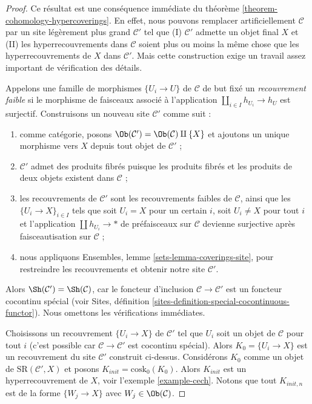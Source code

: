 \begin{proof}
Ce résultat est une conséquence immédiate du
théorème \ref{theorem-cohomology-hypercoverings}.
En effet, nous pouvons remplacer artificiellement $\mathcal{C}$ par un site
légèrement plus grand $\mathcal{C}'$ tel que
(I) $\mathcal{C}'$ admette un objet final $X$ et (II)
les hyperrecouvrements dans $\mathcal{C}$ soient plus ou moins la
même chose que les hyperrecouvrements de $X$ dans $\mathcal{C}'$.
Mais cette construction exige un travail assez important de
vérification des détails.

\medskip\noindent
Appelons une famille de morphismes $\{U_i \to U\}$ de $\mathcal{C}$
de but fixé un {\it recouvrement faible} si le morphisme de faisceaux associé à
l'application $\coprod_{i \in I} h_{U_i} \to h_U$ est surjectif.
Construisons un nouveau site $\mathcal{C}'$ comme suit :
\begin{enumerate}
\item comme catégorie, posons $\Ob(\mathcal{C}') = \Ob(\mathcal{C}) \amalg \{X\}$
et ajoutons un unique morphisme vers $X$ depuis tout objet de $\mathcal{C}'$ ;
\item $\mathcal{C}'$ admet des produits fibrés puisque les produits fibrés et les produits
de deux objets existent dans $\mathcal{C}$ ;
\item les recouvrements de $\mathcal{C}'$ sont les recouvrements faibles de $\mathcal{C}$,
ainsi que les $\{U_i \to X\}_{i \in I}$ tels que soit $U_i = X$
pour un certain $i$, soit $U_i \not = X$ pour tout $i$ et l'application
$\coprod h_{U_i} \to *$ de préfaisceaux sur $\mathcal{C}$ devienne
surjective après faisceautisation sur $\mathcal{C}$ ;
\item nous appliquons Ensembles, lemme \ref{sets-lemma-coverings-site},
pour restreindre les recouvrements et obtenir notre site $\mathcal{C}'$.
\end{enumerate}
Alors $\Sh(\mathcal{C}') = \Sh(\mathcal{C})$, car le foncteur d'inclusion
$\mathcal{C} \to \mathcal{C}'$ est un foncteur cocontinu spécial
(voir Sites, définition \ref{sites-definition-special-cocontinuous-functor}).
Nous omettons les vérifications immédiates.

\medskip\noindent
Choisissons un recouvrement $\{U_i \to X\}$ de $\mathcal{C}'$ tel que $U_i$ soit un
objet de $\mathcal{C}$ pour tout $i$ (c'est possible car
$\mathcal{C} \to \mathcal{C}'$ est cocontinu spécial).
Alors $K_0 = \{U_i \to X\}$ est un recouvrement du
site $\mathcal{C}'$ construit ci-dessus. Considérons $K_0$ comme un objet de
$\text{SR}(\mathcal{C}', X)$ et posons $K_{init} = \text{cosk}_0(K_0)$.
Alors $K_{init}$ est un hyperrecouvrement de $X$, voir
l'exemple \ref{example-cech}. Notons que tout $K_{init, n}$ est de la forme
$\{W_j \to X\}$ avec $W_j \in \Ob(\mathcal{C})$.


\end{proof}
